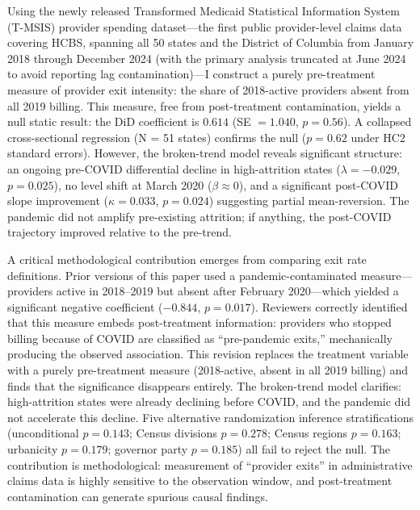 \documentclass[12pt]{article}
\begin{document}
Using the newly released Transformed Medicaid Statistical Information System (T-MSIS) provider spending dataset---the first public provider-level claims data covering HCBS, spanning all 50 states and the District of Columbia from January 2018 through December 2024 (with the primary analysis truncated at June 2024 to avoid reporting lag contamination)---I construct a purely pre-treatment measure of provider exit intensity: the share of 2018-active providers absent from all 2019 billing. This measure, free from post-treatment contamination, yields a null static result: the DiD coefficient is $0.614$ (SE $= 1.040$, $p = 0.56$). A collapsed cross-sectional regression (N = 51 states) confirms the null ($p = 0.62$ under HC2 standard errors). However, the broken-trend model reveals significant structure: an ongoing pre-COVID differential decline in high-attrition states ($\lambda = -0.029$, $p = 0.025$), no level shift at March 2020 ($\beta \approx 0$), and a significant post-COVID slope improvement ($\kappa = 0.033$, $p = 0.024$) suggesting partial mean-reversion. The pandemic did not amplify pre-existing attrition; if anything, the post-COVID trajectory improved relative to the pre-trend.

A critical methodological contribution emerges from comparing exit rate definitions. Prior versions of this paper used a pandemic-contaminated measure---providers active in 2018--2019 but absent after February 2020---which yielded a significant negative coefficient ($-0.844$, $p = 0.017$). Reviewers correctly identified that this measure embeds post-treatment information: providers who stopped billing because of COVID are classified as ``pre-pandemic exits,'' mechanically producing the observed association. This revision replaces the treatment variable with a purely pre-treatment measure (2018-active, absent in all 2019 billing) and finds that the significance disappears entirely. The broken-trend model clarifies: high-attrition states were already declining before COVID, and the pandemic did not accelerate this decline. Five alternative randomization inference stratifications (unconditional $p = 0.143$; Census divisions $p = 0.278$; Census regions $p = 0.163$; urbanicity $p = 0.179$; governor party $p = 0.185$) all fail to reject the null. The contribution is methodological: measurement of ``provider exits'' in administrative claims data is highly sensitive to the observation window, and post-treatment contamination can generate spurious causal findings.
\end{document}
